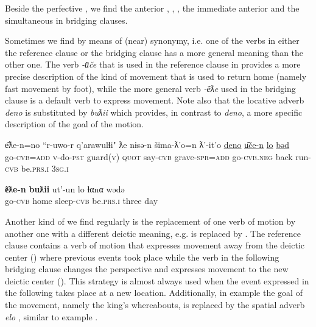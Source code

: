 \documentclass[output=paper]{LSP/langsci}
\begin{document}
Beside the perfective , we find the anterior  , , , the immediate anterior   and the simultaneous   in bridging clauses. 

Sometimes we find  by means of (near) synonymy, i.e. one of the verbs in either the reference clause or the bridging clause has a more general meaning than the other one. The verb \textit{-u͂če}  that is used in the reference clause in  provides a more precise description  of the kind of movement that is used to return home (namely fast movement by foot), while the more general verb  \textit{-e͂ƛe}  used in the bridging clause is a default verb to express movement. Note also that the locative adverb \textit{deno}  is substituted by \textit{buƛii}  which provides, in contrast to \textit{deno}, a more specific description of the goal of the motion. 



\begin{exe}
	\ex	\label{ex:14ab}
	\begin{xlist}
		\ex	\label{ex:14a}
		\gll	e͂ƛe-n=no			``r-uwo-r		q'arawulɬi" 	ƛe			nɨsə-n		šima-ƛ'o=n ƛ'-it'o				\underline{deno}	\underline{u͂če-n}		\underline{lo}			\underline{bəd}\\
			go-\textsc{cvb=add}		\textsc{v}-do-\textsc{pst}		guard(\textsc{v})		\textsc{quot}		say-\textsc{cvb}	grave-\textsc{spr=add} go-\textsc{cvb.neg}		back	run-\textsc{cvb}	be.\textsc{prs.i}	\textsc{3sg.i}\\
		\glt	{}

		\ex	\label{ex:14b}
		\gll	\textbf{e͂ƛe-n}		\textbf{buƛii}		ut'-un			lo				ɬαnα		wədə \\
			go-\textsc{cvb}	home		sleep-\textsc{cvb}	be.\textsc{prs.i}		three		day\\
		\glt	{}
	\end{xlist}
\end{exe}

Another kind of  we find regularly is the replacement of one verb of motion by another one with a different deictic meaning, e.g.  is replaced by  . The reference clause contains a verb of motion that expresses movement away from the deictic center () where previous events took place while the verb in the following bridging clause changes the perspective and expresses movement to the new deictic center (). This strategy is almost always used when the event expressed in the following  takes place at a new location. Additionally, in example  the goal of the movement, namely the king's whereabouts, is replaced by the spatial adverb \textit{elo} , similar to example .
\end{document}
